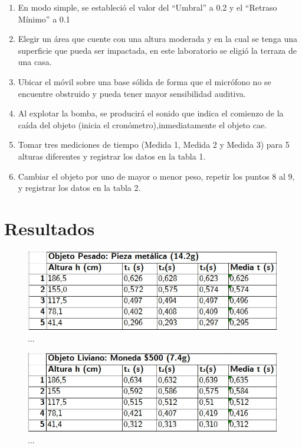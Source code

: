 \begin{multicols}{2}
\begin{enumerate}
    \item En modo simple, se estableció el valor del “Umbral” a 0.2 y el “Retraso Mínimo” a 0.1
    
    \item Elegir un área que cuente con una altura moderada y en la cual se tenga una superficie que pueda ser impactada, en este laboratorio se eligió la terraza de una casa. 
    
    \item Ubicar el móvil sobre una base sólida de forma que el micrófono no se encuentre obstruido y pueda tener mayor sensibilidad auditiva.
    
    \item Al explotar la bomba, se producirá el sonido que indica el comienzo de la caída del objeto (inicia el cronómetro),inmediatamente el objeto cae.
    
    \item Tomar tres mediciones de tiempo (Medida 1, Medida 2 y Medida 3) para 5 alturas diferentes y registrar los datos en la tabla 1.
    
    \item Cambiar el objeto por uno de mayor o menor peso, repetir los puntos 8 al 9, y registrar los datos en la tabla 2.
\end{enumerate}

\section*{Resultados}
\begin{figure}[H]
    \centering
    \includegraphics[scale=0.3]{fig/Tabla1-ObjetoPesado.png}
    \caption{...}
\end{figure}

\begin{figure}[H]
    \centering
    \includegraphics[scale=0.3]{fig/Tabla2-ObjetoLiviano.png}
    \caption{...}
\end{figure}


\end{multicols}
